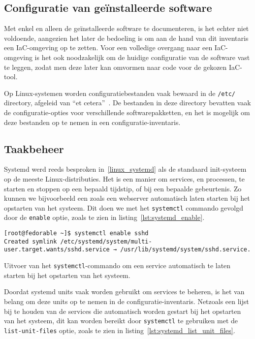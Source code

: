 \subsection{Configuratie van ge{\"i}nstalleerde software}
\label{risico_software_configuratie}

Met enkel en alleen de ge\"installeerde software te documenteren, is het echter niet voldoende, aangezien het later de bedoeling is om aan de hand van dit inventaris een IaC-omgeving op te zetten.
Voor een volledige overgang naar een IaC-omgeving is het ook noodzakelijk om de huidige configuratie van de software vast te leggen, zodat men deze later kan omvormen naar code voor de gekozen IaC-tool.

Op Linux-systemen worden configuratiebestanden vaak bewaard in de \texttt{/etc/} directory, afgeleid van ``et cetera''~\autocite{linuxfoundation-filesystem}.
De bestanden in deze directory bevatten vaak de configuratie-opties voor verschillende softwarepakketten, en het is mogelijk om deze bestanden op te nemen in een configuratie-inventaris.

\subsection{Taakbeheer}
\label{risico_taakbeheer}

Systemd werd reeds besproken in~\ref{linux_systemd} als de standaard init-systeem op de meeste Linux-distributies.
Het is een manier om services, en processen, te starten en stoppen op een bepaald tijdstip, of bij een bepaalde gebeurtenis.
Zo kunnen we bijvoorbeeld een zoals een webserver automatisch laten starten bij het opstarten van het systeem.
Dit doen we met het \texttt{systemctl} commando gevolgd door de \texttt{enable} optie, zoals te zien in listing~\ref{lst:systemd_enable}.

\begin{listing}
  \begin{verbatim}
[root@fedorable ~]$ systemctl enable sshd
Created symlink /etc/systemd/system/multi-user.target.wants/sshd.service → /usr/lib/systemd/system/sshd.service.
  \end{verbatim}
  \caption{Uitvoer van het \texttt{systemctl}-commando om een service automatisch te laten starten bij het opstarten van het systeem.}
  \label{lst:systemd_enable}
\end{listing}

Doordat systemd units vaak worden gebruikt om services te beheren, is het van belang om deze units op te nemen in de configuratie-inventaris.
Netzoals een lijst bij te houden van de services die automatisch worden gestart bij het opstarten van het systeem, dit kan worden bereikt door \texttt{systemctl} te gebruiken met de \texttt{list-unit-files} optie, zoals te zien in listing~\ref{lst:systemd_list_unit_files}.

